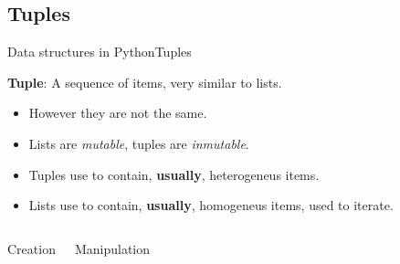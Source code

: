 \documentclass[10pt,compress]{beamer} %
\begin{document}


\subsection{Tuples}
\begin{frame}{Data structures in Python}{Tuples}

	\textbf{Tuple}: A sequence of items, very similar to lists.
		\begin{itemize}
		\item \small However they are not the same.
		\item \small Lists are \textit{mutable}, tuples are \textit{inmutable}.
		\item \small Tuples use to contain, \textbf{usually}, heterogeneus items.
		\item \small Lists use to contain, \textbf{usually}, homogeneus items, used to iterate.
		\end{itemize}
	
	    \begin{columns}
 	   \scriptsize{
		\begin{exampleblock}{Creation}
		\vspace{-0.2cm}
		
		\vspace{-0.2cm}
		\end{exampleblock}
		}
       \vspace{4cm}
 	   \scriptsize{
		\begin{exampleblock}{Manipulation}
		\vspace{-0.2cm}
		
		\vspace{-0.3cm}	
		\end{exampleblock}
		}
		\vspace{2.9 cm}

	\end{columns}
\end{frame}
\end{document}
